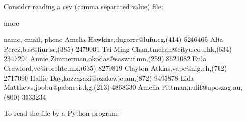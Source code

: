 \documentclass[letterpaper,10pt,english]{sphinxmanual}
\begin{document}
Consider reading a csv (comma separated value) file:

\begin{sphinxVerbatim}[commandchars=\\\{\}]
more 
\end{sphinxVerbatim}

\begin{sphinxVerbatim}[commandchars=\\\{\}]
name, email, phone
Amelia Hawkins,dugorre@lufu.cg,(414) 524\PYGZhy{}6465
Alta Perez,bos@fiur.sc,(385) 247\PYGZhy{}9001
Tai Ming Chan,tmchan@cityu.edu.hk,(634) 234\PYGZhy{}7294
Annie Zimmerman,okodag@saswuf.mn,(259) 862\PYGZhy{}1082
Eula Crawford,ve@rorohte.mx,(635) 827\PYGZhy{}9819
Clayton Atkins,vape@nig.eh,(762) 271\PYGZhy{}7090
Hallie Day,kozzazazi@ozakewje.am,(872) 949\PYGZhy{}5878
Lida Matthews,joobu@pabnesis.kg,(213) 486\PYGZhy{}8330
Amelia Pittman,nulif@uposzag.au,(800) 303\PYGZhy{}3234
\end{sphinxVerbatim}

To read the file by a Python program:

\begin{sphinxVerbatim}[commandchars=\\\{\}]
    
   
         
\end{sphinxVerbatim}
\end{document}
